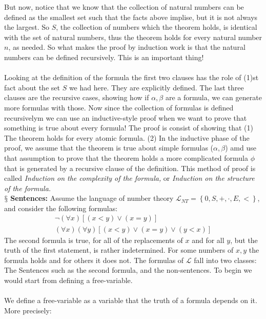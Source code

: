 \documentclass[9pt,a4paper, twocolumn]{article}
\newcounter{theo}
\newcommand{\newpoint}[1]{\ \\ \indent$\mathsection$ \textbf{#1}}
\newcommand{\curveL}{\mathcal{L}}
\begin{document}
        But now, notice that we know that the collection of natural numbers can be defined as the smallest set such that the facts above implise, but it is not always the largest. So $S$, the collection of numbers which the theorem holds, is identical with the set of natural numbers, thus the theorem holds for every natural number $n$, as needed. So what makes the proof by induction work is that the natural numbers can be defined recursively. This is an important thing!
        \\
        \\
        Looking at the definition of the formula the first two clauses has the role of (1)st fact about the set $S$ we had here. They are explicitly defined. The last three clauses are the recursive cases, showing how if $\alpha, \beta$ are a formula, we can generate more formulas with those. Now since the collection of formulas is defined recursivelym we can use an inductive-style proof when we want to prove that something is true about every formula! The proof is consist of showing that (1) The theorem holds for every atomic formula. (2) In the inductive phase of the proof, we assume that the theorem is true about simple formulas ($\alpha,\beta$) amd use that assumption to prove that the theorem holds a more complicated formula $\phi$ that is generated by a recursive clause of the definition. This method of proof is called \textit{Induction on the complexity of the formula,} or \textit{Induction on the structure of the formula.}
        \newpoint{Sentences:} Assume the language of number theory $\curveL_{NT} = \left\{0, S, +, \cdot, E, <\right\}$, and consider the following formulas:
        \begin{align*}
            \neg(\forall x)[(x<y)\lor(x=y)] \\ 
            (\forall x)(\forall y)[(x<y)\lor(x=y)\lor(y<x)]
        \end{align*}
        The second formula is true, for all of the replacements of $x$ and for all $y$, but the truth of the first statement, is rather indetermined. For some numbers of $x,y$ the formula holds and for others it does not. The formulas of $\curveL$ fall into two classes: The Sentences such as the second formula, and the non-sentences. To begin we would start from defining a free-variable.
        \\
        \\
        We define a free-variable as a variable that the truth of a formula depends on it. More precisely:
\end{document}
